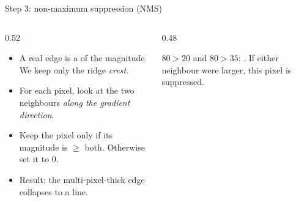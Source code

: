 \documentclass[10pt,aspectratio=169]{beamer}
\begin{document}
\begin{frame}{Step 3: non-maximum suppression (NMS)}
  \begin{columns}[T]
    \begin{column}{0.52\textwidth}
      \begin{itemize}
        \item A real edge is a  of the magnitude. We keep only the ridge \emph{crest}.
        \item For each pixel, look at the two neighbours \emph{along the gradient direction}.
        \item Keep the pixel only if its magnitude is $\geq$ both. Otherwise set it to 0.
        \item Result: the multi-pixel-thick edge collapses to a  line.
      \end{itemize}
    \end{column}
    \begin{column}{0.48\textwidth}
      \begin{center}
      \end{center}
      $80 > 20$ and $80 > 35$: . If either neighbour were larger, this pixel is
      suppressed.
    \end{column}
  \end{columns}
\end{frame}
\end{document}
